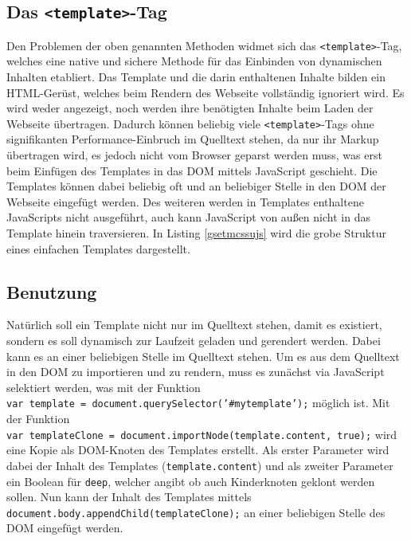 \subsection{Das \texorpdfstring{\texttt{\textless{}template\textgreater{}}-Tag}{\textless{}template\textgreater{}-Tag}}\label{template-tag}

Den Problemen der oben genannten Methoden widmet sich das \texttt{\textless{}template\textgreater{}}-Tag, welches eine native und sichere Methode für das Einbinden von dynamischen Inhalten etabliert. Das Template und die darin enthaltenen Inhalte bilden ein \ac{HTML}-Gerüst, welches beim Rendern des Webseite vollständig ignoriert wird. Es wird weder angezeigt, noch werden ihre benötigten Inhalte beim Laden der Webseite übertragen. Dadurch können beliebig viele \texttt{\textless{}template\textgreater{}}-Tags ohne signifikanten Performance-Einbruch im Quelltext stehen, da nur ihr Markup übertragen wird, es jedoch nicht vom Browser geparst werden muss, was erst beim Einfügen des Templates in das \ac{DOM} mittels JavaScript geschieht. Die Templates können dabei beliebig oft und an beliebiger Stelle in den \ac{DOM} der Webseite eingefügt werden. Des weiteren werden in Templates enthaltene JavaScripts nicht ausgeführt, auch kann JavaScript von außen nicht in das Template hinein traversieren. In Listing \ref{gsetmcssujs} wird die grobe Struktur eines einfachen Templates dargestellt.




\subsection{Benutzung}\label{benutzung}

Natürlich soll ein Template nicht nur im Quelltext stehen, damit es existiert, sondern es soll dynamisch zur Laufzeit geladen und gerendert werden. Dabei kann es an einer beliebigen Stelle im Quelltext stehen. Um es aus dem Quelltext in den \ac{DOM} zu importieren und zu rendern, muss es zunächst via JavaScript selektiert werden, was mit der Funktion \texttt{var\ template\ =\ document.querySelector('\#mytemplate');} möglich ist. Mit der Funktion \texttt{var\ templateClone\ =\ document.importNode(template.content,\ true);} wird eine Kopie als \ac{DOM}-Knoten des Templates erstellt. Als erster Parameter wird dabei der Inhalt des Templates (\texttt{template.content}) und als zweiter Parameter ein Boolean für \texttt{deep}, welcher angibt ob auch Kinderknoten geklont werden sollen. Nun kann der Inhalt des Templates mittels \texttt{document.body.appendChild(templateClone);} an einer beliebigen Stelle des \ac{DOM} eingefügt werden.


